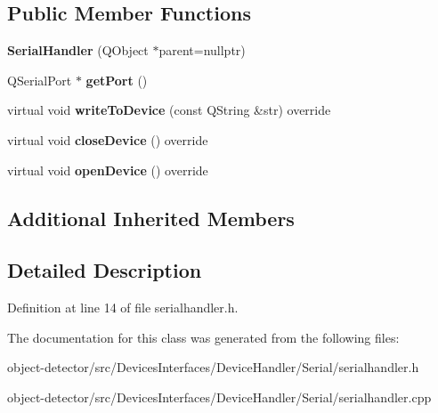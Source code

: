 \subsection*{Public Member Functions}
\begin{DoxyCompactItemize}
\item 
\mbox{\label{class_devices_1_1_serial_handler_a047b7ad42754bbfdad560af14de10285}} 
{\bfseries Serial\+Handler} (Q\+Object $\ast$parent=nullptr)
\item 
\mbox{\label{class_devices_1_1_serial_handler_aed9d868caf3a381b186632c79548c575}} 
Q\+Serial\+Port $\ast$ {\bfseries get\+Port} ()
\item 
\mbox{\label{class_devices_1_1_serial_handler_a0deffd7d3589dfae6ff08a185820c20a}} 
virtual void {\bfseries write\+To\+Device} (const Q\+String \&str) override
\item 
\mbox{\label{class_devices_1_1_serial_handler_a2d1b4bc42515a9c734cc1fa78b52c193}} 
virtual void {\bfseries close\+Device} () override
\item 
\mbox{\label{class_devices_1_1_serial_handler_a955a72ed31a63f73c9c0aea463e97386}} 
virtual void {\bfseries open\+Device} () override
\end{DoxyCompactItemize}
\subsection*{Additional Inherited Members}


\subsection{Detailed Description}


Definition at line 14 of file serialhandler.\+h.



The documentation for this class was generated from the following files\+:\begin{DoxyCompactItemize}
\item 
object-\/detector/src/\+Devices\+Interfaces/\+Device\+Handler/\+Serial/serialhandler.\+h\item 
object-\/detector/src/\+Devices\+Interfaces/\+Device\+Handler/\+Serial/serialhandler.\+cpp\end{DoxyCompactItemize}
